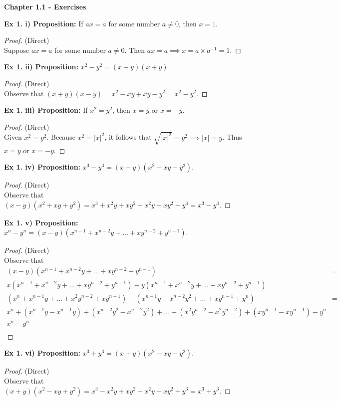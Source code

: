 \documentclass{article}
\date{}
\author{}
\begin{document}
	
	\centerline{\textbf{Chapter 1.1 - Exercises}}
	
	\textbf{Ex 1. i) Proposition:} If $ax=a$ for some number $a \not= 0$, then $x=1$.
	\begin{proof}
		(Direct)\\
		Suppose $ax=a$ for some number $a \not= 0$. Then $ax=a \implies x=a \times a^{-1} = 1$.
	\end{proof}
	
	\textbf{Ex 1. ii) Proposition:} $x^2-y^2=(x-y)(x+y)$.
	\begin{proof}
		(Direct)\\
		Observe that $(x+y)(x-y) = x^2-xy+xy-y^2=x^2-y^2$.
	\end{proof}
	
	\textbf{Ex 1. iii) Proposition:} If $x^2=y^2$, then $x=y$ or $x=-y$.
	\begin{proof}
		(Direct)\\
		Given $x^2=y^2$. Because $x^2=|x|^2$, it follows that $\sqrt{|x|^2}={y^2} \implies |x|=y$. Thus $x=y$ or $x=-y$.
	\end{proof}
	
	\textbf{Ex 1. iv) Proposition:} $x^3-y^3=(x-y)(x^2+xy+y^2)$.
	\begin{proof}
		(Direct)\\
		Observe that $(x-y)(x^2+xy+y^2)=x^3+x^2y+xy^2-x^2y-xy^2-y^3=x^3-y^3$.
	\end{proof}
	
	\textbf{Ex 1. v) Proposition:} $x^n-y^n=(x-y)(x^{n-1} + x^{n-2}y + ... + xy^{n-2} + y^{n-1})$.
	\begin{proof}
		(Direct)\\
		Observe that
		\begin{align*}
			(x-y)(x^{n-1} + x^{n-2}y + ... + xy^{n-2} + y^{n-1}) &=\\
			x(x^{n-1} + x^{n-2}y + ... + xy^{n-2} + y^{n-1})-y(x^{n-1} + x^{n-2}y + ... + xy^{n-2} + y^{n-1}) &=\\
			(x^{n} + x^{n-1}y + ... + x^2y^{n-2} + xy^{n-1})-
			(x^{n-1}y + x^{n-2}y^2 + ... + xy^{n-1} + y^{n}) &=\\
			x^{n} + (x^{n-1}y-x^{n-1}y) + (x^{n-2}y^2-x^{n-2}y^2) + ... + (x^{2}y^{n-2}-x^{2}y^{n-2}) + (xy^{n-1}-xy^{n-1}) - y^n &=\\
			x^n-y^n\\
		\end{align*}
	\end{proof}
	
	\textbf{Ex 1. vi) Proposition:} $x^3+y^3=(x+y)(x^2-xy+y^2)$.
	\begin{proof}
		(Direct)\\
		Observe that $(x+y)(x^2-xy+y^2)=x^3-x^2y+xy^2+x^2y-xy^2+y^3=x^3+y^3$.
	\end{proof}
	
\end{document}

